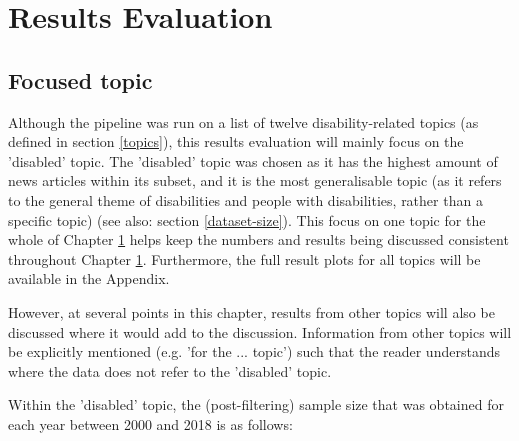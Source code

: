\documentclass{report}
\begin{document}



\chapter{Results Evaluation} \label{Results Evaluation}  %

\section{Focused topic} \label{Focused topic}
Although the pipeline was run on a list of twelve disability-related topics (as defined in section \ref{topics}), this results evaluation will mainly focus on the 'disabled' topic.
The 'disabled' topic was chosen as it has the highest amount of news articles within its subset, and it is the most generalisable topic (as it refers to the general theme of disabilities and people with disabilities, rather than a specific topic) (see also: section \ref{dataset-size}).
This focus on one topic for the whole of Chapter \ref{Results Evaluation} helps keep the numbers and results being discussed consistent throughout Chapter \ref{Results Evaluation}.
Furthermore, the full result plots for all topics will be available in the Appendix.

However, at several points in this chapter, results from other topics will also be discussed where it would add to the discussion.
Information from other topics will be explicitly mentioned (e.g. 'for the ... topic') such that the reader understands where the data does not refer to the 'disabled' topic.

Within the 'disabled' topic, the (post-filtering) sample size that was obtained for each year between 2000 and 2018 is as follows:
\end{document}
